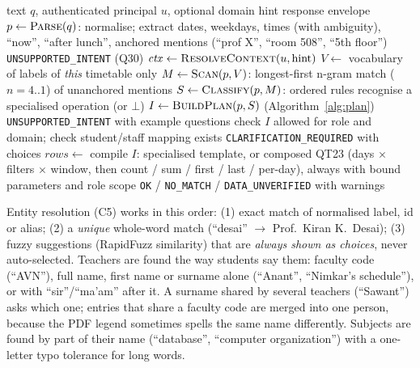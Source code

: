 \begin{algorithm}[H]
\caption{Answer a natural-language question}\label{alg:query}
\begin{algorithmic}[1]
\Require text $q$, authenticated principal $u$, optional domain hint
\Ensure response envelope
\State $p \gets \textsc{Parse}(q)$: normalise; extract dates, weekdays, times (with ambiguity), ``now'', ``after lunch'', anchored mentions (``prof X'', ``room 508'', ``5th floor'')
 \Return \texttt{UNSUPPORTED\_INTENT} (Q30) \EndIf
\State $\mathit{ctx} \gets \textsc{ResolveContext}(u, \text{hint})$ 
\State $V \gets$ vocabulary of labels of \emph{this} timetable only
\State $M \gets \textsc{Scan}(p, V)$: longest-first n-gram match ($n = 4..1$) of unanchored mentions
\State $S \gets \textsc{Classify}(p, M)$: ordered rules recognise a specialised operation (or $\bot$)
\State $I \gets \textsc{BuildPlan}(p, S)$ (Algorithm~\ref{alg:plan})
 \Return \texttt{UNSUPPORTED\_INTENT} with example questions \EndIf
\State check $I$ allowed for role and domain; check student/staff mapping exists
    \Return \texttt{CLARIFICATION\_REQUIRED} with choices \EndIf
\EndFor
\State $\mathit{rows} \gets$ compile $I$: specialised template, or composed QT23 (days $\times$ filters $\times$ window, then count / sum / first / last / per-day), always with bound parameters and role scope
\State \Return \texttt{OK} / \texttt{NO\_MATCH} / \texttt{DATA\_UNVERIFIED} with warnings
\end{algorithmic}
\end{algorithm}
Entity resolution (C5) works in this order: (1) exact match of normalised label, id or alias;
(2) a \emph{unique} whole-word match (``desai'' $\rightarrow$ Prof.\ Kiran K.\ Desai); (3) fuzzy
suggestions (RapidFuzz similarity) that are \emph{always shown as choices}, never auto-selected.
Teachers are found the way students say them: faculty code (``AVN''), full name, first name or surname
alone (``Anant'', ``Nimkar's schedule''), or with ``sir''/``ma'am'' after it. A surname shared by several
teachers (``Sawant'') asks which one; entries that share a faculty code are merged into one person,
because the PDF legend sometimes spells the same name differently. Subjects are found by part of their
name (``database'', ``computer organization'') with a one-letter typo tolerance for long words.

